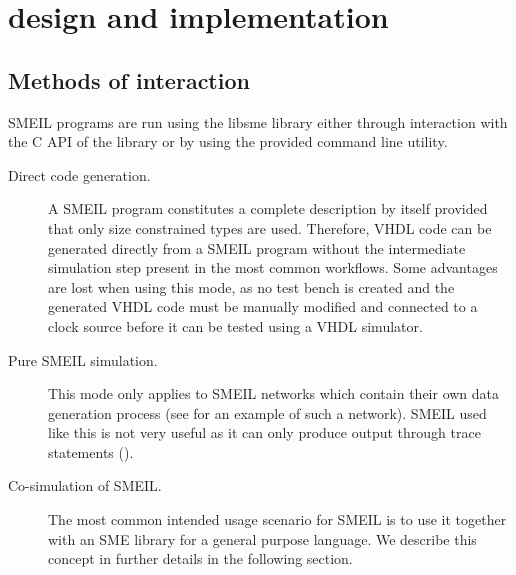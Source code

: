 \chapter{\libsme{} design and implementation}

\section{Methods of interaction}
\label{sec:using}
SMEIL programs are run using the {\ttfamily libsme} library either through interaction
with the C API of the library or by using the provided command line utility.

\begin{description}
\item[Direct code generation.] A SMEIL program constitutes a complete
  description by itself provided that only size constrained types are
  used. Therefore, VHDL code can be generated directly from a SMEIL program
  without the intermediate simulation step present in the most common
  workflows. Some advantages are lost when using this mode, as no test bench is
  created and the generated VHDL code must be manually modified and connected to
  a clock source before it can be tested using a VHDL simulator.
\item[Pure SMEIL simulation.] This mode only applies to SMEIL networks which
  contain their own data generation process (see  for an example
  of such a network). SMEIL used like this is not very useful as it can only
  produce output through {\ttfamily trace} statements ().
  \item[Co-simulation of SMEIL.] The most common intended usage scenario for
    SMEIL is to use it together with an SME library for a general purpose
    language. We describe this concept in further details in the following
    section.
\end{description}

